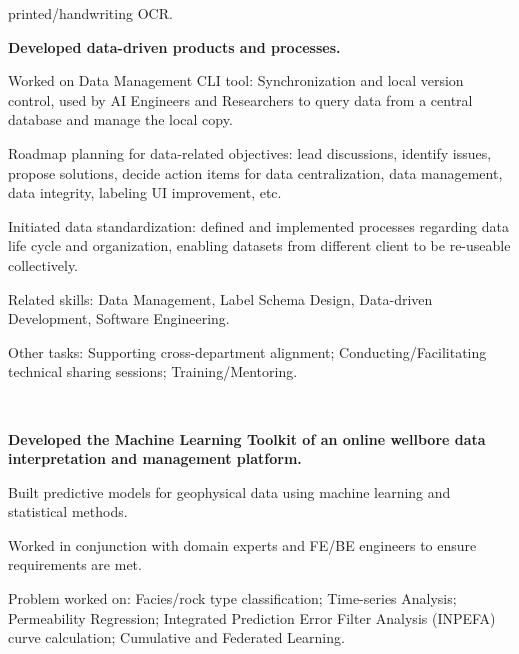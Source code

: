 \begin{xitemize}
\begin{zitemize}
        printed/handwriting OCR.
    \end{zitemize}
    \item \textbf{Developed data-driven products and processes.}
    \begin{zitemize}
        \item Worked on Data Management CLI tool: Synchronization and local version control, used by AI Engineers and Researchers to query data from a central database and manage the local copy.
        \item Roadmap planning for data-related objectives: lead discussions, identify issues, propose solutions, decide action items for data centralization, data management, data integrity, labeling UI improvement, etc.
        \item Initiated data standardization: defined and implemented processes regarding data life cycle and organization, enabling datasets from different client to be re-useable collectively.
        \item Related skills: Data Management, Label Schema Design, Data-driven Development, Software Engineering.
    \end{zitemize}
    \item Other tasks: Supporting cross-department alignment; Conducting/Facilitating technical sharing sessions; Training/Mentoring.
\end{xitemize}

\\
\begin{xitemize}
    \item \textbf{Developed the Machine Learning Toolkit of an online wellbore data interpretation and management platform.}
    \begin{zitemize}
        \item Built predictive models for geophysical data using machine learning and statistical methods.
        \item Worked in conjunction with domain experts and FE/BE engineers to ensure requirements are met.
        \item Problem worked on: Facies/rock type classification; Time-series Analysis; Permeability Regression; Integrated Prediction Error Filter Analysis (INPEFA) curve calculation; Cumulative and Federated Learning.
    \end{zitemize}
\end{xitemize}

